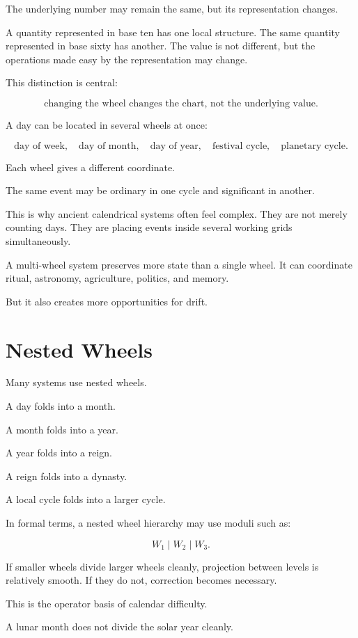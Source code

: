 \documentclass[11pt]{book}
\begin{document}
The underlying number may remain the same, but its representation changes.

A quantity represented in base ten has one local structure. The same quantity represented in base sixty has another. The value is not different, but the operations made easy by the representation may change.

This distinction is central:

\[
\text{changing the wheel changes the chart, not the underlying value}.
\]

A day can be located in several wheels at once:

\[
\text{day of week},
\quad
\text{day of month},
\quad
\text{day of year},
\quad
\text{festival cycle},
\quad
\text{planetary cycle}.
\]

Each wheel gives a different coordinate.

The same event may be ordinary in one cycle and significant in another.

This is why ancient calendrical systems often feel complex. They are not merely counting days. They are placing events inside several working grids simultaneously.

A multi-wheel system preserves more state than a single wheel. It can coordinate ritual, astronomy, agriculture, politics, and memory.

But it also creates more opportunities for drift.

\section{Nested Wheels}

Many systems use nested wheels.

A day folds into a month.

A month folds into a year.

A year folds into a reign.

A reign folds into a dynasty.

A local cycle folds into a larger cycle.

In formal terms, a nested wheel hierarchy may use moduli such as:

\[
W_1 \mid W_2 \mid W_3.
\]

If smaller wheels divide larger wheels cleanly, projection between levels is relatively smooth. If they do not, correction becomes necessary.

This is the operator basis of calendar difficulty.

A lunar month does not divide the solar year cleanly.
\end{document}
